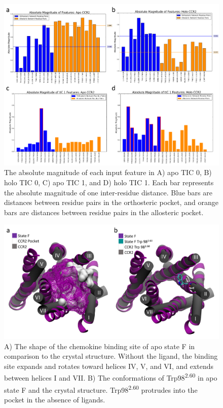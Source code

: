 \begin{figure}[htbp]
  \begin{center}
  \includegraphics[width=\textwidth]{./figures/tic0_tic1_contributions.png}
\caption[Correlation of TICs to CCR2 features]{The absolute magnitude of each input feature in A) apo TIC 0, B) holo TIC 0, C) apo TIC 1, and D) holo TIC 1. Each bar represents the absolute magnitude of one inter-residue distance. Blue bars are distances between residue pairs in the orthosteric pocket, and orange bars are distances between residue pairs in the allosteric pocket.}
\label{fig:tic0_contributions}
  \end{center}
\end{figure}

\begin{figure}[htbp]
\begin{center}
\includegraphics[width=\textwidth]{./figures/apoF_ccr2_orthopocketSI.png}
\caption[Shapes of CCR2 chemokine binding site]{A) The shape of the chemokine binding site of apo state F in comparison to the crystal structure. Without the ligand, the binding site expands and rotates toward helices IV,  V,  and VI, and extends between helices I and VII. B) The conformations of Trp98\textsuperscript{2.60} in apo state F and the crystal structure. Trp98\textsuperscript{2.60} protrudes into the pocket in the absence of ligands.}
\label{fig:apoF_ccr2_orthopocketSI}
\end{center}
\end{figure}

